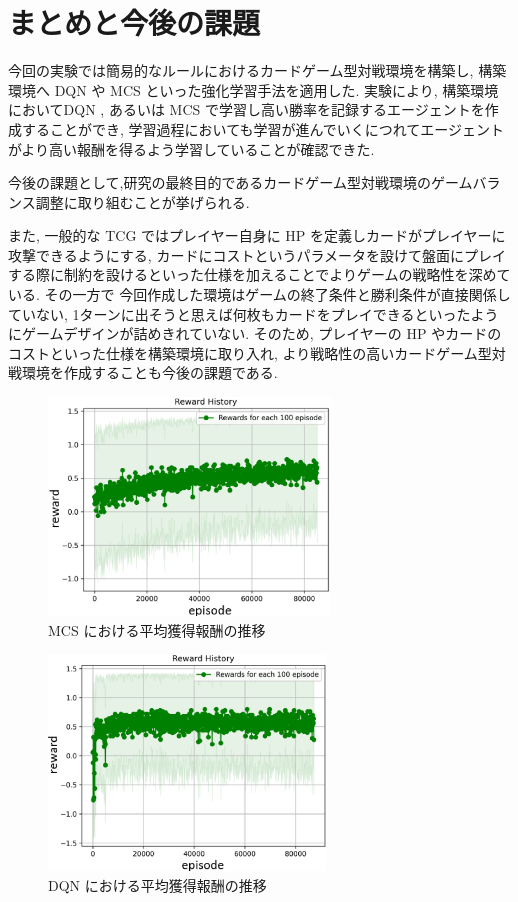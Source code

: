 \documentclass[twocolumn]{jarticle}
\begin{document}
\section{まとめと今後の課題}
今回の実験では簡易的なルールにおけるカードゲーム型対戦環境を構築し, 構築環境へ DQN や MCS といった強化学習手法を適用した. 実験により, 構築環境においてDQN ,  あるいは MCS で学習し高い勝率を記録するエージェントを作成することができ, 学習過程においても学習が進んでいくにつれてエージェントがより高い報酬を得るよう学習していることが確認できた.
\par
今後の課題として,研究の最終目的であるカードゲーム型対戦環境のゲームバランス調整に取り組むことが挙げられる.\par
また, 一般的な TCG ではプレイヤー自身に HP を定義しカードがプレイヤーに攻撃できるようにする, カードにコストというパラメータを設けて盤面にプレイする際に制約を設けるといった仕様を加えることでよりゲームの戦略性を深めている. その一方で
今回作成した環境はゲームの終了条件と勝利条件が直接関係していない, 1ターンに出そうと思えば何枚もカードをプレイできるといったようにゲームデザインが詰めきれていない. そのため, プレイヤーの HP やカードのコストといった仕様を構築環境に取り入れ, より戦略性の高いカードゲーム型対戦環境を作成することも今後の課題である.

\begin{figure}[H]
  \centering
  \includegraphics[width=75mm]{assets/MCS_update.eps.eps}
  \caption{MCS における平均獲得報酬の推移}
  \label{fig:MCSresult}
\end{figure}

\begin{figure}[H]
  \centering
  \includegraphics[width=73.5mm]{assets/DQN_update.eps}
  \caption{DQN における平均獲得報酬の推移}
  \label{fig:DQNresult}
\end{figure}






\end{document}
